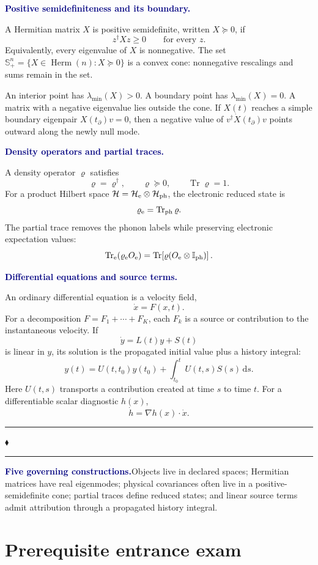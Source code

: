 \documentclass[10pt]{article}
\newcommand{\dd}{\mathrm d}
\newcommand{\Tr}{\operatorname{Tr}}
\newcommand{\Herm}{\operatorname{Herm}}
\newcommand{\PSD}{\mathbb S_{+}}
\newcommand{\I}{\mathbb I}
\newcommand{\pedbox}[2]{%
  \par\medskip
  \noindent\colorbox{pale}{%
    \parbox{\dimexpr\linewidth-2\fboxsep\relax}{%
      \textcolor{navy}{\textbf{#1}}\quad #2%
    }%
  }\par\medskip
}
\newcommand{\conceptbreak}{%
  \par\medskip
  \begin{center}
    \textcolor{muted}{\rule{0.19\linewidth}{0.45pt}\quad
    \(\blacklozenge\)\quad
    \rule{0.19\linewidth}{0.45pt}}
  \end{center}
  \medskip
}
\newcommand{\flowlead}[1]{%
  \par\medskip
  \needspace{3\baselineskip}%
  \noindent\textcolor{navy}{\textbf{#1.}}\enspace\ignorespaces
}
\begin{document}
\flowlead{Positive semidefiniteness and its boundary}

A Hermitian matrix \(X\) is positive semidefinite, written \(X\succeq0\), if
\[
z^\dagger Xz\geq0\qquad\text{for every }z.
\]
Equivalently, every eigenvalue of \(X\) is nonnegative.  The set
\(\PSD^n=\{X\in\Herm(n):X\succeq0\}\) is a convex cone: nonnegative rescalings
and sums remain in the set.

An interior point has \(\lambda_{\min}(X)>0\).  A boundary point has
\(\lambda_{\min}(X)=0\).  A matrix with a negative eigenvalue lies outside the
cone.  If \(X(t)\) reaches a simple boundary eigenpair
\(X(t_\partial)v=0\), then a negative value of
\(v^\dagger\dot X(t_\partial)v\) points outward along the newly null mode.

\flowlead{Density operators and partial traces}

A density operator \(\varrho\) satisfies
\[
\varrho=\varrho^\dagger,\qquad \varrho\succeq0,\qquad \Tr\varrho=1.
\]
For a product Hilbert space
\(\mathcal H=\mathcal H_{\rm e}\otimes\mathcal H_{\rm ph}\), the electronic
reduced state is
\[
\varrho_{\rm e}=\Tr_{\rm ph}\varrho.
\]
The partial trace removes the phonon labels while preserving electronic
expectation values:
\[
\Tr_{\rm e}(\varrho_{\rm e}O_{\rm e})
=\Tr\!\left[\varrho(O_{\rm e}\otimes\I_{\rm ph})\right].
\]

\flowlead{Differential equations and source terms}

An ordinary differential equation is a velocity field,
\[
\dot x=F(x,t).
\]
For a decomposition \(F=F_1+\cdots+F_K\), each \(F_k\) is a source or
contribution to the instantaneous velocity.  If
\[
\dot y=L(t)y+S(t)
\]
is linear in \(y\), its solution is the propagated initial value plus a
history integral:
\[
y(t)=U(t,t_0)y(t_0)+\int_{t_0}^{t}U(t,s)S(s)\,\dd s.
\]
Here \(U(t,s)\) transports a contribution created at time \(s\) to time \(t\).
For a differentiable scalar diagnostic \(h(x)\),
\[
\dot h=\nabla h(x)\cdot\dot x.
\]

\conceptbreak

\pedbox{Five governing constructions.}{Objects live in declared spaces;
Hermitian matrices have real eigenmodes; physical covariances often live in a
positive-semidefinite cone; partial traces define reduced states; and linear
source terms admit attribution through a propagated history integral.}

\clearpage
\part*{Prerequisite entrance exam}
\end{document}
